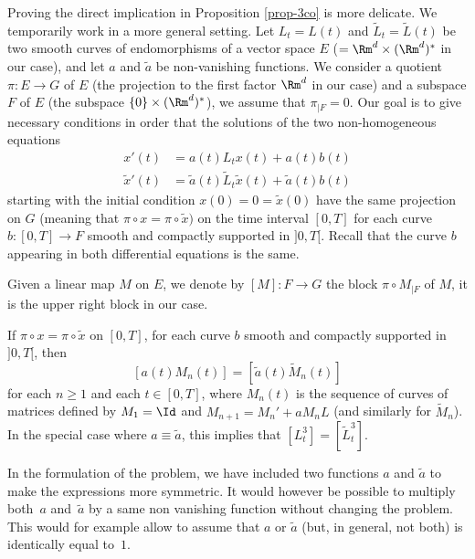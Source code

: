 Proving the direct implication in Proposition \ref{prop-3co} is more delicate. We temporarily work in a more general setting.
Let $L_t=L(t)$ and $\tilde L_t=\tilde L (t)$ be two smooth curves of endomorphisms of a vector space
$E$ ($=\Rm^d\times (\Rm^d)^*$ in our case), and let $a$ and $\tilde a$ be non-vanishing functions.
We consider a quotient $\pi:E\to G$ of $E$ (the projection to the first factor $\Rm^d$ in our case) and a subspace $F$ of $E$
(the subspace $\{0\}\times (\Rm^d)^*$), we assume that $\pi_{|F}=0$.
Our goal is to give necessary conditions in order that
the solutions of the two non-homogeneous equations
\begin{align*}
x'(t) & = a(t)L_t x(t)+a(t)b(t)\\
\tilde x'(t)&=\tilde a(t)\tilde L_t \tilde x(t)+\tilde a(t) b(t)
\end{align*}
starting with the initial condition $x(0)=0=\tilde x(0)$ have the same projection on $G$ (meaning that
$\pi \circ x=\pi \circ \tilde x)$ on the time interval $[0,T]$ for each curve $b:[0,T]\to F$ smooth and compactly supported in $]0,T[$. Recall that the curve
$b$ appearing in both differential equations is the same.

Given a linear map $M$ on $E$, we denote by $[M]:F\to G$ the block $\pi \circ M_{|F}$ of $M$, it is the upper right block in our case.

\begin{lem}\label{lem-pnh}
If $\pi\circ x=\pi \circ \tilde x$ on $[0,T]$, for each curve $b$ smooth and compactly supported in $]0,T[$, then
\[
[a(t)M_n(t)]= [\tilde a(t) \tilde M_n(t)]
\]
for each $n\geq 1$ and each $t\in [0,T]$, where $M_n(t)$ is the sequence of curves of matrices defined by $M_1=\Id$
and $M_{n+1}=M_n'+aM_nL$ (and similarly for $\tilde M_n$).
In the special case where $a\equiv \tilde a$, this implies that
$
[L_t^3]=[\tilde L_t^3].
$
\end{lem}

In the formulation of the problem, we have included two functions $a$ and $\tilde a$ to make the expressions more symmetric.
It would however be possible to multiply both~$a$ and~$\tilde a$ by a same non vanishing function without changing the problem.
This would for example allow to assume that $a$ or $\tilde a$ (but, in general, not both) is
identically equal to~$1$.

